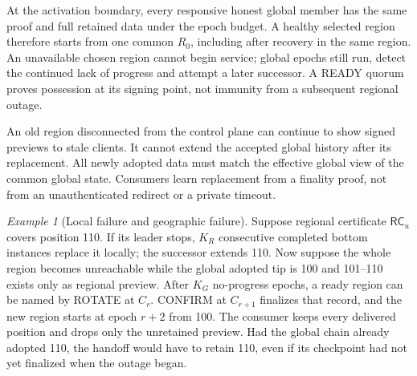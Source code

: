 \documentclass[11pt,a4paper,onecolumn]{article}
\newcommand{\RC}{\mathsf{RC}}
\theoremstyle{remark}\newtheorem{example}[definition]{Example}
\begin{document}
At the activation boundary, every responsive honest global member has the
same proof and full retained data under the epoch budget. A healthy selected
region therefore starts from one common $R_0$, including after recovery in the
same region. An unavailable chosen region
cannot begin service; global epochs still run, detect the continued lack of
progress and attempt a later successor. A READY quorum proves possession at
its signing point, not immunity from a subsequent regional outage.

An old region disconnected from the control plane can continue to show signed
previews to stale clients. It cannot extend the accepted global history after
its replacement. All newly adopted data must match the effective global view
of the common global state. Consumers learn replacement from a finality proof,
not from an unauthenticated redirect or a private timeout.

\begin{example}[Local failure and geographic failure]
Suppose regional certificate $\RC_u$ covers position 110. If its leader stops,
$K_R$ consecutive completed bottom instances replace it locally; the successor
extends 110. Now suppose the whole region becomes unreachable while the global
adopted tip is 100 and 101--110 exists only as regional preview. After $K_G$
no-progress epochs, a ready region can be named by ROTATE at $C_r$. CONFIRM at
$C_{r+1}$ finalizes that record, and the new region starts at epoch $r+2$ from
100. The consumer keeps every delivered position and drops only the unretained
preview. Had the global chain already adopted 110, the handoff would have to
retain 110, even if its checkpoint had not yet finalized when the outage began.
\end{example}

\end{document}
